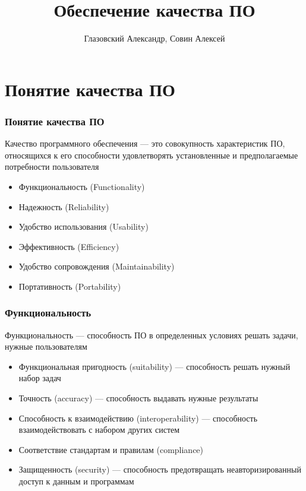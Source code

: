 \documentclass{../industrial-development}
\title{Обеспечение качества ПО}
\author{Глазовский Александр, Совин Алексей}
\date{}
\begin{document}
	
	\begin{frame}
		\titlepage
	\end{frame}
	
	
	
	\section{Понятие качества ПО}
	\begin{frame} \frametitle{Понятие качества ПО}
		\begin{block}{}
			\alert{Качество программного обеспечения} --- это совокупность характеристик ПО, относящихся к его способности удовлетворять установленные и предполагаемые потребности пользователя
		\end{block}
		\begin{itemize}
			\item Функциональность (Functionality)
			\item Надежность (Reliability)
			\item Удобство использования (Usability)
			\item Эффективность (Efficiency)
			\item Удобство сопровождения (Maintainability)
			\item Портативность (Portability)
		\end{itemize}
	\end{frame}
	
	\begin{frame} \frametitle {Функциональность}
		\begin{block}{}
			\alert{Функциональность} --- способность ПО в определенных условиях решать задачи, нужные пользователям
		\end{block}
		\begin{itemize}
			\item Функциональная пригодность (suitability) --- способность решать нужный набор задач
			\item Точность (accuracy) --- способность выдавать нужные результаты
			\item Способность к взаимодействию (interoperability) --- способность взаимодействовать с набором других систем
			\item Соответствие стандартам и правилам (compliance)
			\item Защищенность (security) --- способность предотвращать неавторизированный доступ к данным и программам
		\end{itemize}
	\end{frame}
	
\end{document}
